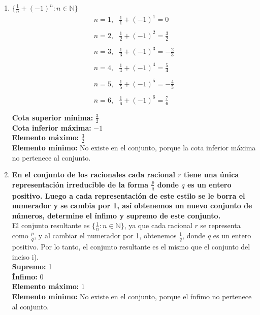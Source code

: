 \documentclass[12pt]{article}
\begin{document}
\begin{enumerate}[label=\textit{\roman*})]
        \newpage

    \item $\{\frac{1}{n} + (-1)^n : n \in \mathbb{N}  \}$\\
        \begin{align*}
            n= 1,\, \, \, \, \frac{1}{1} + (-1)^1 = 0 \\ \\
            n= 2,\, \, \, \, \frac{1}{2} + (-1)^2 = \frac{3}{2} \\ \\
            n= 3,\, \, \, \, \frac{1}{3} + (-1)^3 = -\frac{2}{3} \\ \\
            n= 4,\, \, \, \, \frac{1}{4} + (-1)^4 = \frac{5}{4} \\ \\
            n= 5,\, \, \, \, \frac{1}{5} + (-1)^5 = -\frac{4}{5} \\ \\
            n= 6,\, \, \, \, \frac{1}{6} + (-1)^6 = \frac{7}{6} \\ \\
        \end{align*}    
     \textbf{Cota superior mínima:} $\frac{3}{2}$  \\
    \textbf{Cota inferior máxima:} $-1$ \\
    \textbf{Elemento máximo:} $\frac{3}{2}$\\
    \textbf{Elemento mínimo:} No existe en el conjunto, porque la 
    cota inferior máxima no pertenece al conjunto.\\

    \item \textbf{En el conjunto de los racionales cada racional $r$ tiene una única 
    representación irreducible de la forma $\frac{p}{q}$ donde $q$ es un 
    entero positivo. Luego a cada representación de este estilo se le borra
     el numerador y se cambia por 1, así obtenemos un nuevo conjunto de 
     números, determine el ínfimo y supremo de este conjunto.} \\
        El conjunto resultante es $\{\frac{1}{n} : n \in \mathbb{N}\}$, ya que cada racional $r$ se representa como $\frac{p}{q}$, y al cambiar el numerador por 1, obtenemos $\frac{1}{q}$, donde $q$ es un entero positivo. Por lo tanto, el conjunto resultante es el mismo que el conjunto del inciso i). \\
     \textbf{Supremo:} 1 \\
     \textbf{Ínfimo:} 0 \\
    \textbf{Elemento máximo:} $1$\\
    \textbf{Elemento mínimo:} No existe en el conjunto, porque el ínfimo
     no pertenece al conjunto.\\

\end{enumerate}
\end{document}
